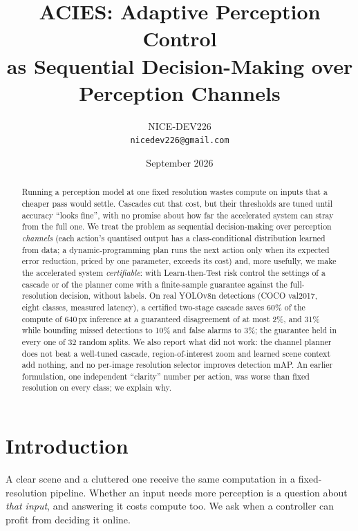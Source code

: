 \documentclass[11pt]{article}
\title{\textbf{ACIES: Adaptive Perception Control \\
as Sequential Decision-Making over Perception Channels}}
\author{
  NICE-DEV226 \\
  \texttt{nicedev226@gmail.com}
}
\date{September 2026}
\begin{document}
\maketitle

\begin{abstract}
Running a perception model at one fixed resolution wastes compute on inputs that a cheaper pass
would settle. Cascades cut that cost, but their thresholds are tuned until accuracy ``looks fine'',
with no promise about how far the accelerated system can stray from the full one. We treat the
problem as sequential decision-making over perception \emph{channels} (each action's quantised
output has a class-conditional distribution learned from data; a dynamic-programming plan runs the
next action only when its expected error reduction, priced by one parameter, exceeds its cost) and,
more usefully, we make the accelerated system \emph{certifiable}: with Learn-then-Test risk control
the settings of a cascade or of the planner come with a finite-sample guarantee against the
full-resolution decision, without labels. On real YOLOv8n detections (COCO val2017, eight classes,
measured latency), a certified two-stage cascade saves 60\% of the compute of 640\,px inference
at a guaranteed disagreement of at most 2\%, and 31\% while bounding missed detections to 10\% and
false alarms to 3\%; the guarantee held in every one of 32 random splits. We also report what did
not work: the channel planner does not beat a well-tuned cascade, region-of-interest zoom and
learned scene context add nothing, and no per-image resolution selector improves detection mAP.
An earlier formulation, one independent ``clarity'' number per action, was worse than fixed
resolution on every class; we explain why.
\end{abstract}

\section{Introduction}
\label{sec:intro}

A clear scene and a cluttered one receive the same computation in a fixed-resolution pipeline.
Whether an input needs more perception is a question about \emph{that input}, and answering it
costs compute too. We ask when a controller can profit from deciding it online.
\end{document}
